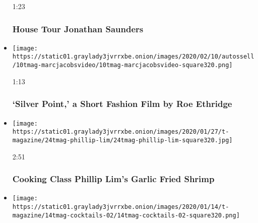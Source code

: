 \begin{itemize}
  1:23

  \hypertarget{house-tour--jonathan-saunders}{%
  \subsubsection{House Tour \textbar{} Jonathan
  Saunders}\label{house-tour--jonathan-saunders}}
\item
  \href{https://www.nytimes3xbfgragh.onion/video/t-magazine/100000006958934/silver-point-a-short-fashion-film-by-roe-ethridge.html?action=click\&module=video-series-bar\&region=header\&pgtype=Article\&playlistId=video/t-magazine}{}

  \texttt{[image: https://static01.graylady3jvrrxbe.onion/images/2020/02/10/autossell/10tmag-marcjacobsvideo/10tmag-marcjacobsvideo-square320.png]}

  1:13

  \hypertarget{silver-point-a-short-fashion-film-by-roe-ethridge}{%
  \subsubsection{`Silver Point,' a Short Fashion Film by Roe
  Ethridge}\label{silver-point-a-short-fashion-film-by-roe-ethridge}}
\item
  \href{https://www.nytimes3xbfgragh.onion/video/t-magazine/100000006938316/cooking-class-phillip-lims-garlic-fried-shrimp.html?action=click\&module=video-series-bar\&region=header\&pgtype=Article\&playlistId=video/t-magazine}{}

  \texttt{[image: https://static01.graylady3jvrrxbe.onion/images/2020/01/27/t-magazine/24tmag-phillip-lim/24tmag-phillip-lim-square320.jpg]}

  2:51

  \hypertarget{cooking-class--phillip-lims-garlic-fried-shrimp}{%
  \subsubsection{Cooking Class \textbar{} Phillip Lim's Garlic Fried
  Shrimp}\label{cooking-class--phillip-lims-garlic-fried-shrimp}}
\item
  \href{https://www.nytimes3xbfgragh.onion/video/t-magazine/100000006913638/taste-test-nonalcoholic-cocktails.html?action=click\&module=video-series-bar\&region=header\&pgtype=Article\&playlistId=video/t-magazine}{}

  \texttt{[image: https://static01.graylady3jvrrxbe.onion/images/2020/01/14/t-magazine/14tmag-cocktails-02/14tmag-cocktails-02-square320.png]}


\end{itemize}
